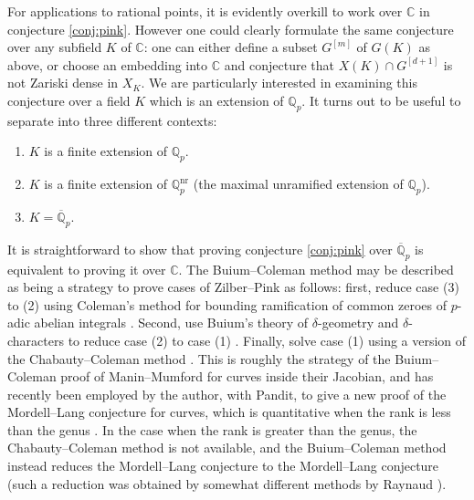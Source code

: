 \documentclass{amsart}
\def\Q{\mathbb Q}
\theoremstyle{definition}
\newcommand{\nr}{\mathrm{nr}}
\begin{document}
For applications to rational points, it is evidently overkill to work over $\mathbb{C}$ in conjecture \ref{conj:pink}. However one could clearly formulate the same conjecture over any subfield $K$ of $\mathbb{C}$: one can either define a subset $G^{[m]}$ of $G(K)$ as above, or choose an embedding into $\mathbb{C}$ and conjecture that $X(K)\cap G^{[d+1]}$ is not Zariski dense in $X_K$. We are particularly interested in examining this conjecture over a field $K$ which is an extension of $\Q _p $. It turns out to be useful to separate into three different contexts: 
\begin{enumerate}
\item $K$ is a finite extension of $\Q _p $. 
\item $K$ is a finite extension of $\Q _p ^{\nr }$ (the maximal unramified extension of $\Q _p $).
\item $K=\overline{\Q }_p $. 
\end{enumerate}
It is straightforward to show that proving conjecture \ref{conj:pink} over $\overline{\Q }_p$ is equivalent to proving it over $\mathbb{C}$. The Buium--Coleman method may be described as being a strategy to prove cases of Zilber--Pink as follows: first, reduce case (3) to (2) using Coleman's method for bounding ramification of common zeroes of $p$-adic abelian integrals \cite{coleman:ramified}.  Second, use Buium's theory of $\delta $-geometry and $\delta $-characters to reduce case (2) to case (1) \cite{buium:96,buium:95,buium:97}. Finally, solve case (1) using a version of the Chabauty--Coleman method \cite{coleman:chabauty}. This is roughly the strategy of the Buium--Coleman proof of Manin--Mumford for curves inside their Jacobian, and has recently been employed by the author, with Pandit, to give a new proof of the Mordell--Lang conjecture for curves, which is quantitative when the rank is less than the genus \cite{DP}. In the case when the rank is greater than the genus, the Chabauty--Coleman method is not available, and the Buium--Coleman method instead reduces the Mordell--Lang conjecture to the Mordell--Lang conjecture (such a reduction was obtained by somewhat different methods by Raynaud \cite{Ray83}).
\end{document}
